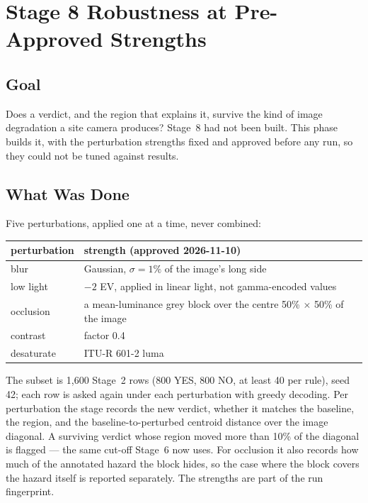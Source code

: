 \chapter{Stage 8 Robustness at Pre-Approved Strengths}
\label{chap:s2-4}

\section{Goal}

Does a verdict, and the region that explains it, survive the kind of image degradation a site camera
produces? Stage~8 had not been built. This phase builds it, with the perturbation strengths fixed and
approved before any run, so they could not be tuned against results.

\section{What Was Done}

Five perturbations, applied one at a time, never combined:

\begin{center}
\begin{tabular}{lp{9.2cm}}
\toprule
\textbf{perturbation} & \textbf{strength (approved 2026-11-10)} \\
\midrule
blur       & Gaussian, $\sigma = 1\%$ of the image's long side \\
low light  & $-2$ EV, applied in linear light, not gamma-encoded values \\
occlusion  & a mean-luminance grey block over the centre 50\% $\times$ 50\% of the image \\
contrast   & factor 0.4 \\
desaturate & ITU-R 601-2 luma \\
\bottomrule
\end{tabular}
\end{center}

The subset is 1,600 Stage~2 rows (800 YES, 800 NO, at least 40 per rule), seed 42; each row is asked again
under each perturbation with greedy decoding. Per perturbation the stage records the new verdict, whether it
matches the baseline, the region, and the baseline-to-perturbed centroid distance over the image diagonal.
A surviving verdict whose region moved more than 10\% of the diagonal is flagged --- the same cut-off Stage~6
now uses. For occlusion it also records how much of the annotated hazard the block hides, so the case where
the block covers the hazard itself is reported separately. The strengths are part of the run fingerprint.

